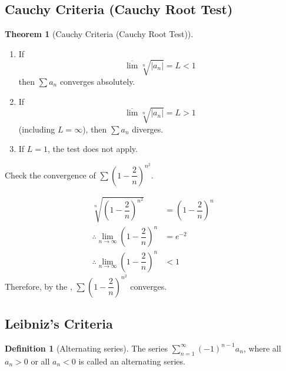\documentclass[fleqn, a4paper, 12pt, twoside]{article}
\theoremstyle{definition}
\newtheorem{definition}{Definition}
\theoremstyle{theorem}
\newtheorem{theorem}{Theorem}
\begin{document}
\subsection{Cauchy Criteria (Cauchy Root Test)}

\begin{theorem}[Cauchy Criteria (Cauchy Root Test)]
	\begin{enumerate}
		\item
			If 
			\begin{equation*}
			\overline{\lim} \sqrt[n]{|a_n|} = L < 1
			\end{equation*}
			then $\sum a_n$ converges absolutely.
		\item
			If 
			\begin{equation*}
			\overline{\lim} \sqrt[n]{|a_n|} = L > 1
			\end{equation*}
			(including $L = \infty$), then $\sum a_n$ diverges.
		\item If $L = 1$, the test does not apply.
	\end{enumerate}
	\label{Cauchy_Criteria_(Cauchy_Root_Test)}
\end{theorem}

\begin{question}
	Check the convergence of $\sum \left( 1 - \dfrac{2}{n} \right)^{n^2}$.
\end{question}

\begin{solution}
	\begin{align*}
		\sqrt[n]{\left( 1 - \dfrac{2}{n} \right)^{n^2}} &= \left( 1 - \dfrac{2}{n} \right)^n\\
		\therefore \lim\limits_{n \to \infty} \left( 1 - \dfrac{2}{n} \right)^n &= e^{-2}\\
		\therefore \lim\limits_{n \to \infty} \left( 1 - \dfrac{2}{n} \right)^n &< 1
	\end{align*}
	Therefore, by the , $\sum \left( 1 - \dfrac{2}{n} \right)^{n^2}$ converges.
\end{solution}

\subsection{Leibniz's Criteria}

\begin{definition}[Alternating series]
	The series $\sum\limits_{n = 1}^{\infty} (-1)^{n - 1} a_n$, where all $a_n > 0$ or all $a_n < 0$ is called an alternating series.
\end{definition}
\end{document}
